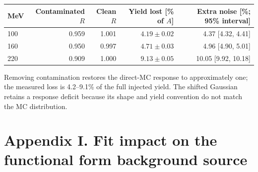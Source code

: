 \documentclass[11pt]{article}
\begin{document}
\begin{center}\small\begin{tabular}{lrrrr}\toprule
MeV & Contaminated $R$ & Clean $R$ & Yield lost [\% of $A$] & Extra noise [\%; 95\% interval]\\\midrule
100 & 0.959 & 1.001 & $4.19\pm0.02$ & 4.37 [4.32, 4.41]\\
160 & 0.950 & 0.997 & $4.71\pm0.03$ & 4.96 [4.90, 5.01]\\
220 & 0.909 & 1.000 & $9.13\pm0.05$ & 10.05 [9.92, 10.18]\\
\bottomrule\end{tabular}\end{center}Removing contamination restores the direct-MC response to approximately one; the measured loss is 4.2--9.1\% of the full injected yield. The shifted Gaussian retains a response deficit because its shape and yield convention do not match the MC distribution.\clearpage\section*{Appendix I. Fit impact on the functional form background source}
\end{document}
